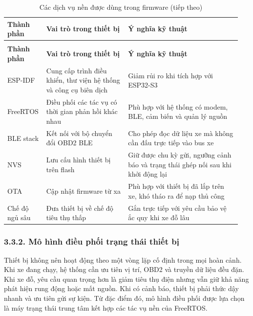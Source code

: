 \documentclass[a4paper]{extarticle}
\newcommand{\thesissettableid}[2]{%
  \renewcommand{\thetable}{#1}%
  \renewcommand{\theHtable}{#2}%
}
\begin{document}
{\thesissettableid{3.15}{condensed-bang-3-15-cac-dich-vu-nen-duoc-dung-trong-firmware}
\def\LTcaptype{table}
\begin{longtable}{|L{0.140\linewidth}|L{0.340\linewidth}|L{0.470\linewidth}|}
\caption{Các dịch vụ nền được dùng trong firmware}\label{tab:condensed-bang-3-15-cac-dich-vu-nen-duoc-dung-trong-firmware}\\
\hline
\textbf{Thành phần} & \textbf{Vai trò trong thiết bị} & \textbf{Ý nghĩa kỹ thuật} \\
\hline
\endfirsthead
\caption[]{Các dịch vụ nền được dùng trong firmware (tiếp theo)}\\
\hline
\textbf{Thành phần} & \textbf{Vai trò trong thiết bị} & \textbf{Ý nghĩa kỹ thuật} \\
\hline
\endhead
\endfoot
\endlastfoot
ESP-IDF & Cung cấp trình điều khiển, thư viện hệ thống và công cụ biên dịch & Giảm rủi ro khi tích hợp với ESP32-S3 \\\hline
FreeRTOS & Điều phối các tác vụ có thời gian phản hồi khác nhau & Phù hợp với hệ thống có modem, BLE, cảm biến và quản lý nguồn \\\hline
BLE stack & Kết nối với bộ chuyển đổi OBD2 BLE & Cho phép đọc dữ liệu xe mà không cần đấu trực tiếp vào bus xe \\\hline
NVS & Lưu cấu hình thiết bị trên flash & Giữ được chu kỳ gửi, ngưỡng cảnh báo và trạng thái ghép nối sau khi khởi động lại \\\hline
OTA & Cập nhật firmware từ xa & Phù hợp với thiết bị đã lắp trên xe, khó tháo ra để nạp thủ công \\\hline
Chế độ ngủ sâu & Đưa thiết bị về chế độ tiêu thụ thấp & Gắn trực tiếp với yêu cầu bảo vệ ắc quy khi xe đỗ lâu \\\hline
\end{longtable}
}

\subsubsection{3.3.2. Mô hình điều phối trạng thái thiết bị}\label{muxf4-huxecnh-ux111iux1ec1u-phux1ed1i-trux1ea1ng-thuxe1i-thiux1ebft-bux1ecb}

Thiết bị không nên hoạt động theo một vòng lặp cố định trong mọi hoàn cảnh. Khi
xe đang chạy, hệ thống cần ưu tiên vị trí, OBD2 và truyền dữ liệu đều đặn. Khi
xe đỗ, yêu cầu quan trọng hơn là giảm tiêu thụ điện nhưng vẫn giữ khả năng phát
hiện rung động hoặc mất nguồn. Khi có cảnh báo, thiết bị phải thức dậy nhanh và
ưu tiên gửi sự kiện. Từ đặc điểm đó, mô hình điều phối được lựa chọn là máy
trạng thái trung tâm kết hợp các tác vụ nền của FreeRTOS.
\end{document}
